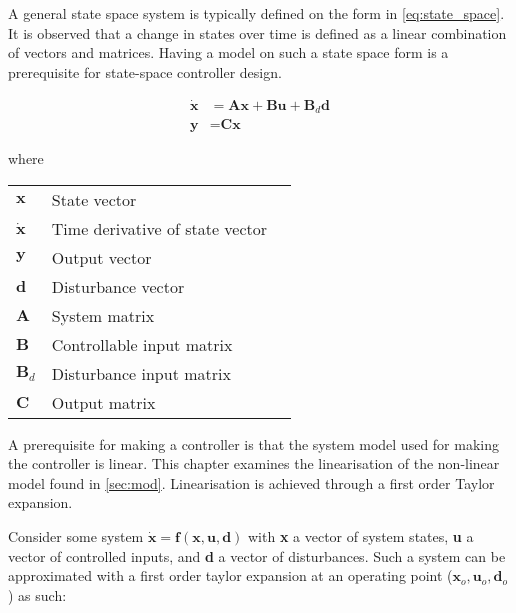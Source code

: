 A general state space system is typically defined on the form in \cref{eq:state_space}. It is observed that a change in states over time is defined as a linear combination of vectors and matrices. Having a model on such a state space form is a prerequisite for state-space controller design.

\begin{equation} \label{eq:state_space}
	\begin{split}
		\dot{\textbf{x}} & = \textbf{A}\textbf{x} + \textbf{B}\textbf{u} + \textbf{B}_d\textbf{d} \\
		\textbf{y} 		& = \textbf{C}\textbf{x}
	\end{split}
\end{equation}

where


\begin{center}
	\begin{tabular}{l p{8cm} l}
		$\textbf{x}$       & State vector                    &  \\
		$\dot{\textbf{x}}$ & Time derivative of state vector &  \\
		$\textbf{y}$       & Output vector                   &  \\
		$\textbf{d}$       & Disturbance vector              &  \\
		$\textbf{A}$       & System matrix                   &  \\
		$\textbf{B}$       & Controllable input matrix       &  \\
		$\textbf{B}_d$     & Disturbance input matrix        &  \\
		$\textbf{C}$       & Output matrix                   &
	\end{tabular}
\end{center}

A prerequisite for making a controller is that the system model used for making the controller is linear. This chapter examines the linearisation of the non-linear model found in \cref{sec:mod}. Linearisation is achieved through a first order Taylor expansion.

Consider some system $\dot{\textbf{x}} = \textbf{f}(\textbf{x},\textbf{u},\textbf{d})$ with \textbf{x} a vector of system states, \textbf{u} a vector of controlled inputs, and \textbf{d} a vector of disturbances. Such a system can be approximated with a first order taylor expansion at an operating point ($\textbf{x}_o, \textbf{u}_o, \textbf{d}_o$) as such:




